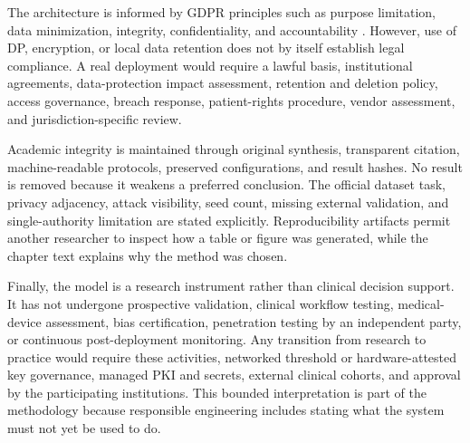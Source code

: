 The architecture is informed by GDPR principles such as purpose limitation, data minimization, integrity, confidentiality, and accountability \cite{europeanunion2016gdpr}. However, use of DP, encryption, or local data retention does not by itself establish legal compliance. A real deployment would require a lawful basis, institutional agreements, data-protection impact assessment, retention and deletion policy, access governance, breach response, patient-rights procedure, vendor assessment, and jurisdiction-specific review.

Academic integrity is maintained through original synthesis, transparent citation, machine-readable protocols, preserved configurations, and result hashes. No result is removed because it weakens a preferred conclusion. The official dataset task, privacy adjacency, attack visibility, seed count, missing external validation, and single-authority limitation are stated explicitly. Reproducibility artifacts permit another researcher to inspect how a table or figure was generated, while the chapter text explains why the method was chosen.

Finally, the model is a research instrument rather than clinical decision support. It has not undergone prospective validation, clinical workflow testing, medical-device assessment, bias certification, penetration testing by an independent party, or continuous post-deployment monitoring. Any transition from research to practice would require these activities, networked threshold or hardware-attested key governance, managed PKI and secrets, external clinical cohorts, and approval by the participating institutions. This bounded interpretation is part of the methodology because responsible engineering includes stating what the system must not yet be used to do.

